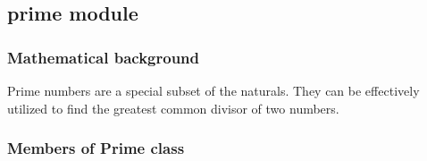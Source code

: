 \documentclass[letterpaper,10pt,english]{sphinxhowto}
\begin{document}
\subsection{prime module}
\label{\detokenize{prime:prime-module}}\label{\detokenize{prime::doc}}

\subsubsection{Mathematical background}
\label{\detokenize{prime:mathematical-background}}
Prime numbers are a special subset of the naturals.
They can be effectively utilized to find the greatest common divisor of two numbers.


\subsubsection{Members of Prime class}
\label{\detokenize{prime:module-prime}}\label{\detokenize{prime:members-of-prime-class}}
\end{document}
